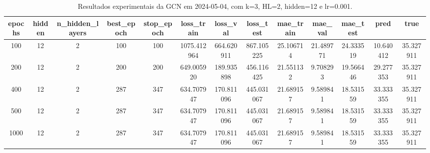 \begin{table}[h]
\centering
\caption{Resultados experimentais da GCN em 2024-05-04, com k=3, HL=2, hidden=12 e lr=0.001.}
\label{tab:gcn_results_k3_hl2_h12_d20240504}
\begin{tabular}{ccccccccccccc}
\toprule
epochs & hidden & n\_hidden\_layers & best\_epoch & stop\_epoch & loss\_train & loss\_val & loss\_test & mae\_train & mae\_val & mae\_test & pred & true \\
\midrule
100 & 12 & 2 & 100 & 100 & 1075.412964 & 664.620911 & 867.105225 & 25.106714 & 21.489771 & 24.333519 & 10.640412 & 35.327911 \\
200 & 12 & 2 & 200 & 200 & 649.005920 & 189.935898 & 456.116425 & 21.551132 & 9.708293 & 19.566446 & 29.277353 & 35.327911 \\
400 & 12 & 2 & 287 & 347 & 634.707947 & 170.811096 & 445.031067 & 21.689157 & 9.589841 & 18.531559 & 33.333355 & 35.327911 \\
500 & 12 & 2 & 287 & 347 & 634.707947 & 170.811096 & 445.031067 & 21.689157 & 9.589841 & 18.531559 & 33.333355 & 35.327911 \\
1000 & 12 & 2 & 287 & 347 & 634.707947 & 170.811096 & 445.031067 & 21.689157 & 9.589841 & 18.531559 & 33.333355 & 35.327911 \\
\bottomrule
\end{tabular}
\end{table}
